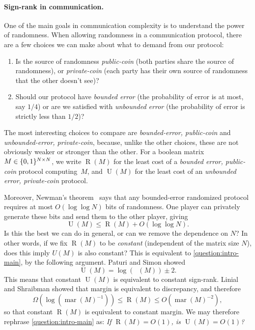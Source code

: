 \documentclass[conference]{IEEEtran}
\DeclareMathOperator{\signrank}{rank_\pm}
\DeclareMathOperator{\margin}{\mathrm{mar}}
\DeclareMathOperator{\U}{U}
\DeclareMathOperator{\Rand}{R}
\begin{document}
\paragraph{Sign-rank in communication.}
One of the main goals in communication complexity is to understand the power of
randomness. When allowing randomness in a communication protocol, there are a
few choices we can make about what to demand from our protocol:
\begin{enumerate}[itemsep=0pt]
\item Is the source of randomness \emph{public-coin} (both parties share the source of randomness),
or \emph{private-coin} (each party has their own source of randomness that the other doesn't see)?
\item Should our protocol have \emph{bounded error} (the probability of error is at most, say $1/4$)
or are we satisfied with \emph{unbounded error} (the probability of error is strictly less than
$1/2$)?
\end{enumerate}
The most interesting choices to compare are \emph{bounded-error, public-coin}
and \emph{unbounded-error, private-coin}, because, unlike the other choices,
these are not obviously weaker or stronger than the other. For a boolean matrix
$M \in \{0,1\}^{N \times N}$, we write $\Rand(M)$ for the least cost of a
\emph{bounded error, public-coin} protocol computing~$M$, and $\U(M)$ for the
least cost of an \emph{unbounded error, private-coin} protocol.

Moreover, Newman's theorem~\cite{New91} says that any bounded-error randomized protocol requires at most $O(\log\log N)$ bits of randomness. One player can privately generate these bits and send them to the other player, giving
\begin{equation}
  \U(M) \leq \Rand(M) + O(\log\log N) .
\end{equation}
Is this the best we can do in general, or can we remove the dependence on $N$?
In other words, if we fix $\Rand(M)$ to be \emph{constant} (\ie independent of the
matrix size $N$), does this imply $U(M)$ is also constant? This is equivalent to
\cref{question:intro-main}, by the following argument. Paturi and Simon
\cite{PS86} showed
\begin{equation}
  \U(M) = \log(\signrank(M))\pm 2.
\end{equation}
This means that constant $\U(M)$ is equivalent to constant sign-rank. 
Linial and Shraibman \cite{LS09} showed that margin is equivalent to discrepancy, and therefore
\begin{equation}
\Omega(\log(\margin(M)^{-1})) \leq \Rand(M) \leq O(\margin(M)^{-2}) ,
\end{equation}
so that constant $\Rand(M)$ is equivalent to constant margin. We may therefore rephrase
\cref{question:intro-main} as: \emph{If $\Rand(M) = O(1)$, is $\U(M) = O(1)$?}
\end{document}
